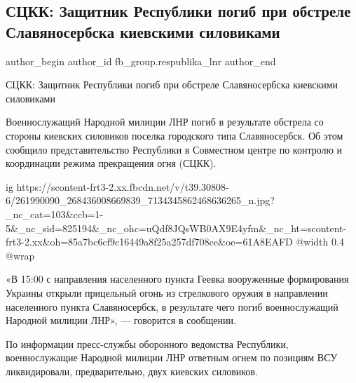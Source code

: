  
 
 
 
 
 
\subsection{СЦКК: Защитник Республики погиб при обстреле Славяносербска киевскими силовиками}
\label{sec:28_11_2021.fb.fb_group.respublika_lnr.1.obstrel_gibel}
 
\ifcmt
 author_begin
   author_id fb_group.respublika_lnr
 author_end
\fi

СЦКК: Защитник Республики погиб при обстреле Славяносербска киевскими
силовиками

Военнослужащий Народной милиции ЛНР погиб в результате обстрела со стороны
киевских силовиков поселка городского типа Славяносербск. Об этом сообщило
представительство Республики в Совместном центре по контролю и координации
режима прекращения огня (СЦКК).

\ifcmt
  ig https://scontent-frt3-2.xx.fbcdn.net/v/t39.30808-6/261990090_268436008669839_7134345862468636265_n.jpg?_nc_cat=103&ccb=1-5&_nc_sid=825194&_nc_ohc=uQdf8JQsWB0AX9E4yfm&_nc_ht=scontent-frt3-2.xx&oh=85a7bc6cf9c16449a8f25a257df708ce&oe=61A8EAFD
  @width 0.4
  @wrap 
\fi

«В 15:00 с направления населенного пункта Геевка вооруженные формирования
Украины открыли прицельный огонь из стрелкового оружия в направлении
населенного пункта Славяносербск, в результате чего погиб военнослужащий
Народной милиции ЛНР», — говорится в сообщении.

По информации пресс-службы оборонного ведомства Республики, военнослужащие
Народной милиции ЛНР ответным огнем по позициям ВСУ ликвидировали,
предварительно, двух киевских силовиков.

